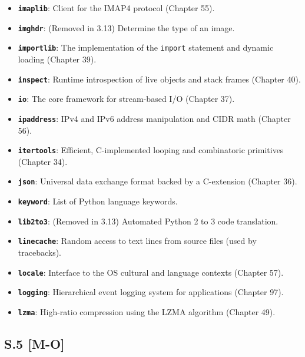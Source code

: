 \begin{itemize}
\tightlist
\item
  \textbf{\passthrough{\lstinline!imaplib!}}: Client for the IMAP4
  protocol (Chapter 55).
\item
  \textbf{\passthrough{\lstinline!imghdr!}}: (Removed in 3.13) Determine
  the type of an image.
\item
  \textbf{\passthrough{\lstinline!importlib!}}: The implementation of
  the \passthrough{\lstinline!import!} statement and dynamic loading
  (Chapter 39).
\item
  \textbf{\passthrough{\lstinline!inspect!}}: Runtime introspection of
  live objects and stack frames (Chapter 40).
\item
  \textbf{\passthrough{\lstinline!io!}}: The core framework for
  stream-based I/O (Chapter 37).
\item
  \textbf{\passthrough{\lstinline!ipaddress!}}: IPv4 and IPv6 address
  manipulation and CIDR math (Chapter 56).
\item
  \textbf{\passthrough{\lstinline!itertools!}}: Efficient, C-implemented
  looping and combinatoric primitives (Chapter 34).
\item
  \textbf{\passthrough{\lstinline!json!}}: Universal data exchange
  format backed by a C-extension (Chapter 36).
\item
  \textbf{\passthrough{\lstinline!keyword!}}: List of Python language
  keywords.
\item
  \textbf{\passthrough{\lstinline!lib2to3!}}: (Removed in 3.13)
  Automated Python 2 to 3 code translation.
\item
  \textbf{\passthrough{\lstinline!linecache!}}: Random access to text
  lines from source files (used by tracebacks).
\item
  \textbf{\passthrough{\lstinline!locale!}}: Interface to the OS
  cultural and language contexts (Chapter 57).
\item
  \textbf{\passthrough{\lstinline!logging!}}: Hierarchical event logging
  system for applications (Chapter 97).
\item
  \textbf{\passthrough{\lstinline!lzma!}}: High-ratio compression using
  the LZMA algorithm (Chapter 49).
\end{itemize}

\hypertarget{s.5-m-o}{%
\subsection{S.5 {[}M-O{]}}\label{s.5-m-o}}

